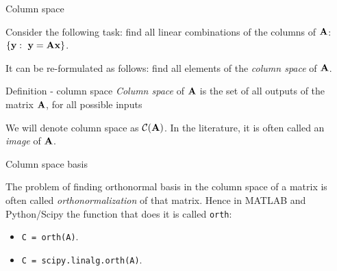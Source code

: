 \documentclass{beamer}
\begin{document}
\begin{frame}{Column space}
	\begin{flushleft}
		
		Consider the following task: find all linear combinations of the columns of $\mathbf{A}$: $\{ \mathbf{y}: \ \mathbf{y} = \mathbf{A} \mathbf{x}  \}$.
		
		\bigskip
		
		It can be re-formulated as follows: find all elements of the \emph{column space} of $\mathbf{A}$.
		
		\begin{block}{Definition - column space}
			\emph{Column space} of $\mathbf{A}$ is the set of all outputs of the matrix $\mathbf{A}$, for all possible inputs
		\end{block}
		
		\bigskip
		
		We will denote column space as $\mathcal{C}(\mathbf{A})$. In the literature, it is often called an \emph{image} of $\mathbf{A}$.
		
	\end{flushleft}
\end{frame}



\begin{frame}{Column space basis}
	\begin{flushleft}
		
		The problem of finding orthonormal basis in the column space of a matrix is often called \emph{orthonormalization} of that matrix. Hence in MATLAB and Python/Scipy the function that does it is called \texttt{orth}:
		
		\bigskip
		
		\begin{itemize}
			\item \texttt{C = orth(A)}.
			\item \texttt{C = scipy.linalg.orth(A)}.
		\end{itemize}
		
		\bigskip
		
%		
		
	\end{flushleft}
\end{frame}
\end{document}
